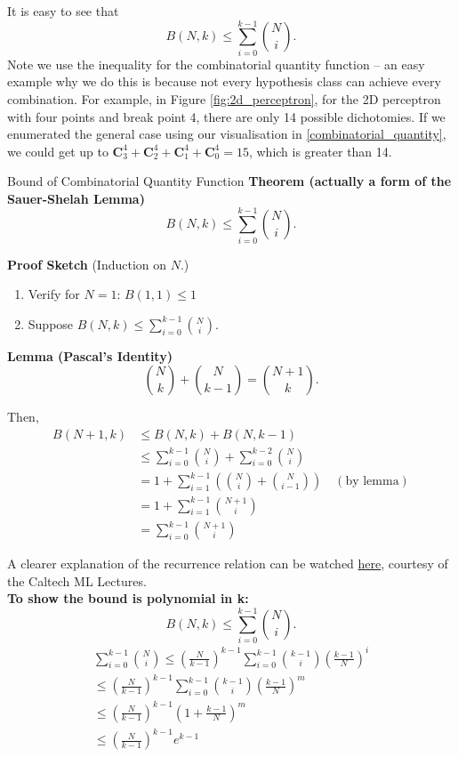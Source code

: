 It is easy to see that \[ B(N, k) \leq \sum_{i=0}^{k-1} \binom{N}{i} . \]
Note we use the inequality for the combinatorial quantity function – an easy example why we do this is because not every hypothesis class can achieve every combination. For example, in Figure \ref{fig:2d_perceptron}, for the 2D perceptron with four points and break point 4, there are only 14 possible dichotomies. If we enumerated the general case using our visualisation in \ref{combinatorial_quantity}, we could get up to $\textbf{C}^4_3+\textbf{C}^4_2+\textbf{C}^4_1+\textbf{C}^4_0 = 15$, which is greater than 14.

\begin{sidenotebox}{Bound of Combinatorial Quantity Function}\label{combquant_function_bound}
\textbf{Theorem (actually a form of the Sauer-Shelah Lemma)}
\[ B(N, k) \leq \sum_{i=0}^{k-1} \binom{N}{i} . \]

\textbf{Proof Sketch}
(Induction on \(N\).)
\begin{enumerate}
    \item Verify for \(N = 1\): \( B(1,1) \leq 1 \) \checkmark
    \item Suppose \( B(N, k) \leq \sum_{i=0}^{k-1} \binom{N}{i} \).
\end{enumerate}

\textbf{Lemma (Pascal's Identity)}
\[ \binom{N}{k} + \binom{N}{k-1} = \binom{N+1}{k} . \]

    



Then,
\begin{align*}
B(N + 1, k) &\leq B(N, k) + B(N, k - 1) \\
&\leq \sum_{i=0}^{k-1} \binom{N}{i} + \sum_{i=0}^{k-2} \binom{N}{i} \\
&= 1 + \sum_{i=1}^{k-1} \left( \binom{N}{i} + \binom{N}{i-1} \right) \quad (\text{by lemma}) \\
&= 1 + \sum_{i=1}^{k-1} \binom{N+1}{i} \\
&= \sum_{i=0}^{k-1} \binom{N+1}{i}
\end{align*}

A clearer explanation of the recurrence relation can be watched \href{https://youtu.be/6FWRijsmLtE?si=Tg2jX1YDYAjXFdE0&t=372}{here}, courtesy of the Caltech ML Lectures. \\

\textbf{To show the bound is polynomial in k:}
\[ B(N, k) \leq \sum_{i=0}^{k-1} \binom{N}{i} . \]
\begin{align*}
    \sum_{i=0}^{k-1} \binom{N}{i} \leq \left(\frac{N}{k-1}\right)^{k-1} \sum_{i=0}^{k-1} \binom{k-1}{i} \left(\frac{k-1}{N}\right)^i\\
\leq \left(\frac{N}{k-1}\right)^{k-1} \sum_{i=0}^{k-1} \binom{k-1}{i} \left(\frac{k-1}{N}\right)^m\\
\leq \left(\frac{N}{k-1}\right)^{k-1} \left(1 + \frac{k-1}{N}\right)^m\\
\leq \left(\frac{N}{k-1}\right)^{k-1} e^{k-1} \\
\end{align*}


\end{sidenotebox}

